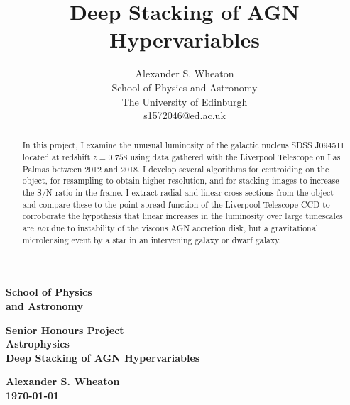 \documentclass[a4paper,11pt]{article}
\title{Deep Stacking of AGN Hypervariables}
\author{
    Alexander S. Wheaton\\
    School of Physics and Astronomy\\
    The University of Edinburgh\\
    s1572046@ed.ac.uk\break
}
\begin{document}
\thispagestyle{empty}                   %
\epsfxsize=40mm                         %
\begin{minipage}[b]{110mm}
    {\Huge\bf School of Physics\\ and Astronomy
    \vspace*{17mm}}
\end{minipage}
\hfill
\begin{minipage}[t]{40mm}
\end{minipage}
\par\noindent                                           %
\vspace*{2cm}
\begin{center}
    \Large\bf \Large\bf Senior Honours Project\\
    \Large\bf Astrophysics\\[10pt]                     %
    \LARGE\bf Deep Stacking of AGN Hypervariables
\end{center}
\vspace*{0.5cm}
\begin{center}
    \bf Alexander S. Wheaton\\
    \today
\end{center}
\vspace*{5mm}

\begin{abstract}
    In this project, I examine the unusual luminosity of the galactic nucleus
    SDSS J094511 located at redshift $z=0.758$ using data gathered with the
    Liverpool Telescope on Las Palmas between 2012 and 2018. I develop several
    algorithms for centroiding on the object, for resampling to obtain higher
    resolution, and for stacking images to increase the S/N ratio in the frame.
    I extract radial and linear cross sections from the object and compare these
    to the point-spread-function of the Liverpool Telescope CCD to corroborate
    the hypothesis that linear increases in the luminosity over large timescales
    are \textit{not} due to instability of the viscous AGN accretion disk, but a
    gravitational microlensing event by a star in an intervening galaxy or dwarf
    galaxy.
\end{abstract}
\end{document}
